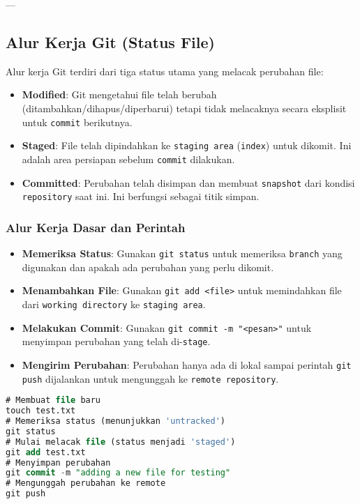 \documentclass{article}
\begin{document}
---

\subsection{Alur Kerja Git (Status File)}
Alur kerja Git terdiri dari tiga status utama yang melacak perubahan file:

\begin{itemize}
    \item \textbf{Modified}: Git mengetahui file telah berubah (ditambahkan/dihapus/diperbarui) tetapi tidak melacaknya secara eksplisit untuk \texttt{commit} berikutnya.
    \item \textbf{Staged}: File telah dipindahkan ke \texttt{staging area} (\texttt{index}) untuk dikomit. Ini adalah area persiapan sebelum \texttt{commit} dilakukan.
    \item \textbf{Committed}: Perubahan telah disimpan dan membuat \texttt{snapshot} dari kondisi \texttt{repository} saat ini. Ini berfungsi sebagai titik simpan.
\end{itemize}

\subsubsection{Alur Kerja Dasar dan Perintah}
\begin{itemize}
    \item \textbf{Memeriksa Status}: Gunakan \texttt{git status} untuk memeriksa \texttt{branch} yang digunakan dan apakah ada perubahan yang perlu dikomit.
    \item \textbf{Menambahkan File}: Gunakan \texttt{git add <file>} untuk memindahkan file dari \texttt{working directory} ke \texttt{staging area}.
    \item \textbf{Melakukan Commit}: Gunakan \texttt{git commit -m "<pesan>"} untuk menyimpan perubahan yang telah di-\texttt{stage}.
    \item \textbf{Mengirim Perubahan}: Perubahan hanya ada di lokal sampai perintah \texttt{git push} dijalankan untuk mengunggah ke \texttt{remote repository}.
\end{itemize}

\begin{lstlisting}[language=SQL, caption={Contoh Alur Kerja Dasar Git}, captionpos=b]
# Membuat file baru
touch test.txt
# Memeriksa status (menunjukkan 'untracked')
git status
# Mulai melacak file (status menjadi 'staged')
git add test.txt
# Menyimpan perubahan
git commit -m "adding a new file for testing"
# Mengunggah perubahan ke remote
git push
\end{lstlisting}
\end{document}
